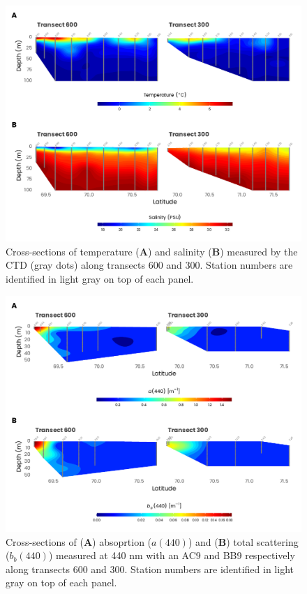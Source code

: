 \documentclass[essd, manuscript]{copernicus}
\begin{document}
\clearpage

\begin{figure}[H]
	\centering
	\includegraphics[scale = 1]{../../../graphs/fig04.pdf}
	\caption{Cross-sections of temperature (\textbf{A}) and salinity (\textbf{B}) measured by the CTD (gray dots) along transects 600 and 300. Station numbers are identified in light gray on top of each panel.}
\end{figure}

\clearpage

\begin{figure}[H]
	\centering
	\includegraphics[scale = 0.85]{../../../graphs/fig05.pdf}
	\caption{Cross-sections of (\textbf{A}) absoprtion ($a(440)$) and (\textbf{B}) total scattering ($b_b(440)$) measured at 440 nm with an AC9 and BB9 respectively along transects 600 and 300. Station numbers are identified in light gray on top of each panel.}
\end{figure}
\end{document}
